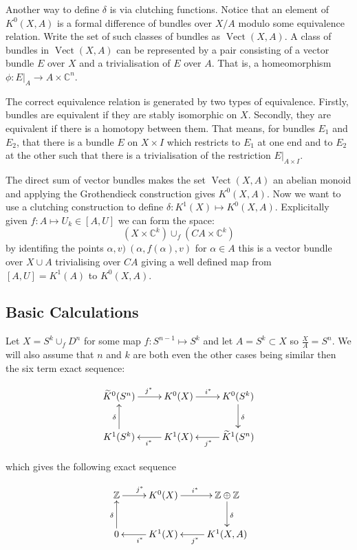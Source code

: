 \documentclass[a4paper,10pt]{article}
\theoremstyle{plain}%
\theoremstyle{definition}
\theoremstyle{remark}
\newcommand{\ZZ}{\mathbb{Z}}
\newcommand{\CC}{\mathbb{C}}
\newcommand{\KR}{\widetilde{K}}   %
\DeclareMathOperator{\Vect}{Vect}
\begin{document}
Another way to define $\delta$ is via clutching functions. Notice that
an element of $K^0(X,A)$ is a formal difference of bundles over $X/A$
modulo some equivalence relation. Write the set of such classes of
bundles as $\Vect(X,A)$. A class of bundles in $\Vect(X,A)$ can be
represented by a pair consisting of a vector bundle $E$ over $X$ and a
trivialisation of $E$ over $A$. That is, a homeomorphism $\phi:
E|_A\to A\times \CC^n$.

The correct equivalence relation is generated by two types of
equivalence. Firstly, bundles are equivalent if they are stably
isomorphic on $X$. Secondly, they are equivalent if there is a
homotopy between them. That means, for bundles $E_1$ and $E_2$, that
there is a bundle $E$ on $X\times I$ which restricts to $E_1$ at one
end and to $E_2$ at the other such that there is a trivialisation of
the restriction $E|_{A\times I}$.

The direct sum of vector bundles makes the set $\Vect(X,A)$ an abelian
monoid and applying the Grothendieck construction gives
$K^0(X,A)$. Now we want to use a clutching construction to define 
$\delta:K^1(X)\mapsto K^0(X,A)$. Explicitally given $f:A\mapsto U_k\in[A,U]$ 
we can form the space:
$$(X\times \CC^k)\cup_f(C A\times\CC^k)$$
by identifing the points $\alpha,v)~(\alpha,f(\alpha),v)$ for $\alpha\in A$ 
this is a vector bundle over $X\cup A$ trivialising over $C A$ giving a 
well defined map from $[A,U]=K^1(A)$ to $K^0(X,A)$.

\subsection{Basic Calculations}

Let $X=S^k\cup_fD^n$ for some map $f:S^{n-1}\mapsto S^k$ and let $A=S^k\subset X$ so
$\frac{X}{A}=S^n$. We will also assume that $n$ and $k$ are both even the other cases
being similar then the six term exact sequence:

\begin{equation}
  \xymatrix{
    \KR^0(S^n) \ar[r]^{j^*} & K^0(X) \ar[r]^{i^*} & K^0(S^k)\ar[d]^{\delta}\\
    K^1(S^k)\ar[u]^{\delta} & K^1(X)\ar[l]^{i^*} & \KR^1(S^n)\ar[l]^{j^*}
  }
\end{equation}

which gives the following exact sequence

\begin{equation}
  \xymatrix{
    \ZZ \ar[r]^{j^*} & K^0(X) \ar[r]^{i^*} & \ZZ\oplus\ZZ\ar[d]^{\delta}\\
    0 \ar[u]^{\delta} & K^1(X)\ar[l]^{i^*} & K^1(X,A)\ar[l]^{j^*}
  }
\end{equation}
\end{document}
